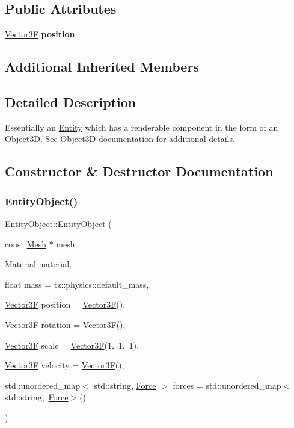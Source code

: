 \subsection*{Public Attributes}
\begin{DoxyCompactItemize}
\item 
\mbox{\label{class_entity_object_a45eaeffd7566fa587d51d47c5c96bdb9}} 
\mbox{\hyperlink{class_vector3}{Vector3F}} {\bfseries position}
\end{DoxyCompactItemize}
\subsection*{Additional Inherited Members}


\subsection{Detailed Description}
Essentially an \mbox{\hyperlink{class_entity}{Entity}} which has a renderable component in the form of an Object3D. See Object3D documentation for additional details. 

\subsection{Constructor \& Destructor Documentation}
\mbox{\label{class_entity_object_a61a11b3d675a49b17b9f9a0b6130f015}} 
\subsubsection{\texorpdfstring{Entity\+Object()}{EntityObject()}}
{\footnotesize\ttfamily Entity\+Object\+::\+Entity\+Object (\begin{DoxyParamCaption}\item[{const \mbox{\hyperlink{class_mesh}{Mesh}} $\ast$}]{mesh,  }\item[{\mbox{\hyperlink{class_material}{Material}}}]{material,  }\item[{float}]{mass = {\ttfamily tz\+:\+:physics\+:\+:default\+\_\+mass},  }\item[{\mbox{\hyperlink{class_vector3}{Vector3F}}}]{position = {\ttfamily \mbox{\hyperlink{class_vector3}{Vector3F}}()},  }\item[{\mbox{\hyperlink{class_vector3}{Vector3F}}}]{rotation = {\ttfamily \mbox{\hyperlink{class_vector3}{Vector3F}}()},  }\item[{\mbox{\hyperlink{class_vector3}{Vector3F}}}]{scale = {\ttfamily \mbox{\hyperlink{class_vector3}{Vector3F}}(1,~1,~1)},  }\item[{\mbox{\hyperlink{class_vector3}{Vector3F}}}]{velocity = {\ttfamily \mbox{\hyperlink{class_vector3}{Vector3F}}()},  }\item[{std\+::unordered\+\_\+map$<$ std\+::string, \mbox{\hyperlink{class_force}{Force}} $>$}]{forces = {\ttfamily std\+:\+:unordered\+\_\+map$<$std\+:\+:string,~\mbox{\hyperlink{class_force}{Force}}$>$()} }\end{DoxyParamCaption})}

